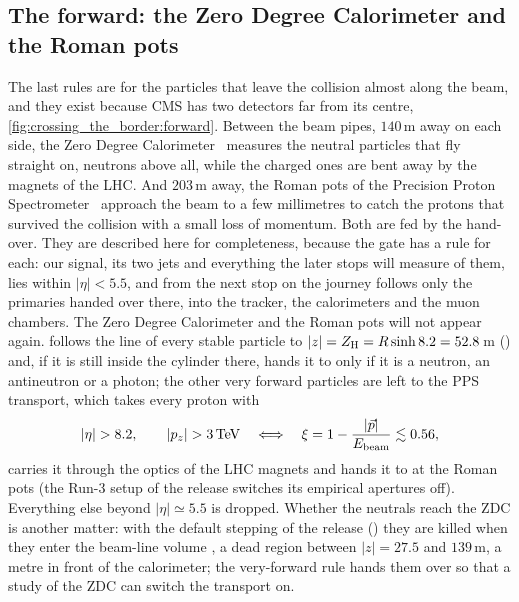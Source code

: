 \subsection{The forward: the Zero Degree Calorimeter and the Roman pots}
\label{sec:crossing_the_border:forward}

The last rules are for the particles that leave the collision almost along
the beam, and they exist because CMS has two detectors far from its centre,
\cref{fig:crossing_the_border:forward}. Between the beam pipes, $140$\,m away
on each side, the Zero Degree Calorimeter~\cite{Grachov:2006ke} measures the
neutral particles that fly straight on, neutrons above all, while the
charged ones are bent away by the magnets of the LHC. And $203$\,m away, the
Roman pots of the Precision Proton Spectrometer~\cite{CMS:2014sdw,CMS:2022dmc}
approach the beam to a few millimetres to catch the protons that survived
the collision with a small loss of momentum. Both are fed by the hand-over.
They are described here for completeness, because the gate has a rule for
each: our signal, its two jets and everything the later stops will measure
of them, lies within $|\eta|<5.5$, and from the next stop on the journey
follows only the primaries handed over there, into the tracker, the
calorimeters and the muon chambers. The Zero Degree Calorimeter and the
Roman pots will not appear again.
 follows the line of every stable particle to
$|z|=Z_{\mathrm{H}}=R\sinh8.2=52.8$\,m () and, if it is still
inside the cylinder there, hands it to \GEANT only if it is a neutron, an
antineutron or a photon; the other very forward particles are left to the
PPS transport, which takes every proton with
\begin{equation}
  |\eta|>8.2,\qquad |p_z|>3\TeV
  \quad\Longleftrightarrow\quad
  \xi=1-\frac{|\vec p|}{E_{\mathrm{beam}}}\lesssim0.56 ,
  \label{eq:crossing_the_border:pps}
\end{equation}
carries it through the optics of the LHC magnets and hands it to \GEANT at
the Roman pots (the Run-3 setup of the release switches its empirical
apertures off). Everything else beyond $|\eta|\simeq5.5$ is dropped. Whether
the neutrals reach the ZDC is another matter: with the default stepping of
the release () they are killed when they
enter the beam-line volume , a dead region between
$|z|=27.5$ and $139$\,m, a metre in front of the calorimeter; the
very-forward rule hands them over so that a study of the ZDC can switch
the transport on.

